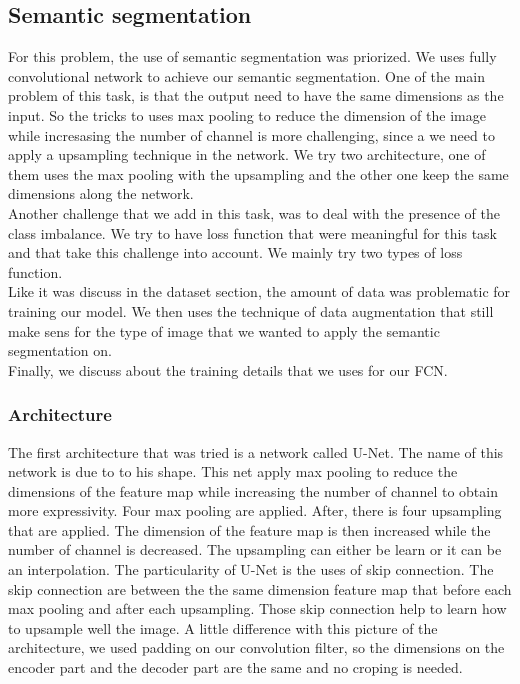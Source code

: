 \subsection{Semantic segmentation}
For this problem, the use of semantic segmentation was priorized. We uses fully convolutional network to achieve our semantic segmentation. One of the main problem of this task, is that the output need to have the same dimensions as the input. So the tricks to uses max pooling to reduce the dimension of the image while incresasing the number of channel is more challenging, since a we need to apply a upsampling technique in the network. We try two architecture, one of them uses the max pooling with the upsampling and the other one keep the same dimensions along the network. 
\\
Another challenge that we add in this task, was to deal with the presence of the class imbalance. We try to have loss function that were meaningful for this task and that take this challenge into account. We mainly try two types of loss function.
\\
Like it was discuss in the dataset section, the amount of data was problematic for training our model. We then uses the technique of data augmentation that still make sens for the type of image that we wanted to apply the semantic segmentation on.
\\
Finally, we discuss about the training details that we uses for our FCN.

\subsubsection{Architecture}
The first architecture that was tried is a network called U-Net. The name of this network is due to to his shape. This net apply max pooling to reduce the dimensions of the feature map while increasing the number of channel to obtain more expressivity. Four max pooling are applied. After, there is four upsampling that are applied. The dimension of the feature map is then increased while the number of channel is decreased. The upsampling can either be learn or it can be an interpolation. The particularity of U-Net is the uses of skip connection. The skip connection are between the the same dimension feature map that before each max pooling and after each upsampling. Those skip connection help to learn how to upsample well the image. A little difference with this picture of the architecture, we used padding on our convolution filter, so the dimensions on the encoder part and the decoder part are the same and no croping is needed.

